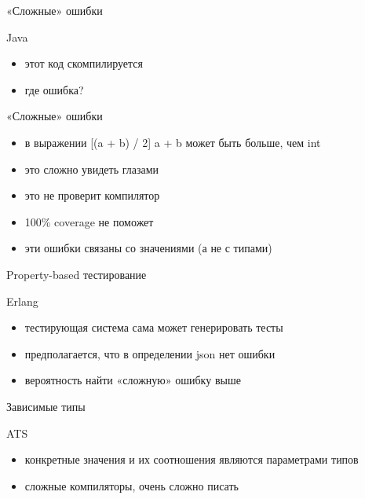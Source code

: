 \documentclass[10pt]{beamer}
\begin{document}
\begin{frame}{«Сложные» ошибки}
  \begin{block}{Java}
    \centering
    \small
    \lstset{language=java}
    
  \end{block}
  \begin{itemize}
  \item этот код скомпилируется
  \item где ошибка?
  \end{itemize}
\end{frame}

\begin{frame}{«Сложные» ошибки}
  \begin{itemize}
  \item в выражении [(a + b) / 2] a + b может быть больше, чем int
  \item это сложно увидеть глазами
  \item это не проверит компилятор
  \item 100\% coverage не поможет
  \item эти ошибки связаны со значениями (а не с типами)
  \end{itemize}
\end{frame}

\begin{frame}{Property-based тестирование}
  \begin{block}{Erlang}
    \centering
    \small
    \lstset{language=erlang}
    
  \end{block}
  \begin{itemize}
  \item тестирующая система сама может генерировать тесты
  \item предполагается, что в определении json нет ошибки
  \item вероятность найти «сложную» ошибку выше
  \end{itemize}
\end{frame}

\begin{frame}{Зависимые типы}
  \begin{block}{ATS}
    \centering
    \small
    \lstset{language=c}
    
  \end{block}
  \begin{itemize}
  \item конкретные значения и их соотношения являются параметрами типов
  \item сложные компиляторы, очень сложно писать
  \end{itemize}
\end{frame}
\end{document}
